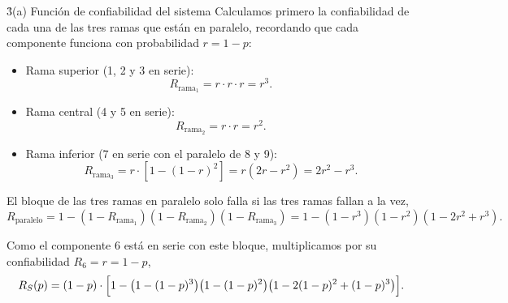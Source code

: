 \documentclass[practices.tex]{subfiles}%
\begin{document}
\vspace{3mm}
\h3{(a) Función de confiabilidad del sistema}
Calculamos primero la confiabilidad de cada una de las tres ramas que están en paralelo, recordando que cada componente funciona con probabilidad $r = 1 - p$:
\begin{itemize}
    \item Rama superior (1, 2 y 3 en serie):
    \begin{equation*}
        R_{\text{rama}_1} = r \cdot r \cdot r = r^3.
    \end{equation*}
    \item Rama central (4 y 5 en serie):
    \begin{equation*}
        R_{\text{rama}_2} = r \cdot r = r^2.
    \end{equation*}
    \item Rama inferior (7 en serie con el paralelo de 8 y 9):
    \begin{equation*}
        R_{\text{rama}_3} = r \cdot \left[ 1 - (1 - r)^2 \right] = r(2r - r^2) = 2r^2 - r^3.
    \end{equation*}
\end{itemize}

El bloque de las tres ramas en paralelo solo falla si las tres ramas fallan a la vez,
\begin{equation*}
    R_{\text{paralelo}} = 1 - (1 - R_{\text{rama}_1})(1 - R_{\text{rama}_2})(1 - R_{\text{rama}_3}) = 1 - (1 - r^3)(1 - r^2)(1 - 2r^2 + r^3).
\end{equation*}

Como el componente 6 está en serie con este bloque, multiplicamos por su confiabilidad $R_6 = r = 1 - p$,
\begin{equation*}
    R_S(p) = (1 - p) \cdot \Bigl[ 1 - \bigl(1 - (1-p)^3\bigr)\bigl(1 - (1-p)^2\bigr)\bigl(1 - 2(1-p)^2 + (1-p)^3\bigr) \Bigr].
\end{equation*}

\end{document}
